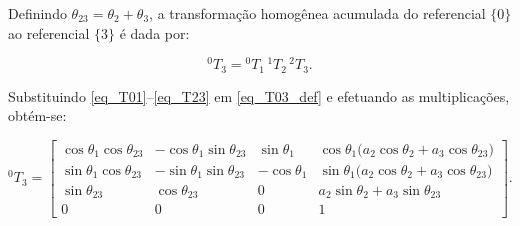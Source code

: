 


Definindo $\theta_{23}=\theta_2+\theta_3$, a transformação homogênea acumulada do referencial $\{0\}$ ao referencial $\{3\}$ é dada por:

\begin{equation}
{}^{0}T_{3} = {}^{0}T_{1}\,{}^{1}T_{2}\,{}^{2}T_{3}.
\label{eq_T03_def}
\end{equation}

Substituindo \eqref{eq_T01}--\eqref{eq_T23} em \eqref{eq_T03_def} e efetuando as multiplicações, obtém-se:

\begin{equation}
{}^{0}T_{3} =
\begin{bmatrix}
\cos\theta_{1}\cos\theta_{23} & -\cos\theta_{1}\sin\theta_{23} & \sin\theta_{1} & \cos\theta_{1}\bigl(a_2\cos\theta_{2}+a_3\cos\theta_{23}\bigr)\\
\sin\theta_{1}\cos\theta_{23} & -\sin\theta_{1}\sin\theta_{23} & -\cos\theta_{1} & \sin\theta_{1}\bigl(a_2\cos\theta_{2}+a_3\cos\theta_{23}\bigr)\\
\sin\theta_{23} & \cos\theta_{23} & 0 & a_2\sin\theta_{2}+a_3\sin\theta_{23}\\
0 & 0 & 0 & 1
\end{bmatrix}.
\label{eq_T03_final}
\end{equation}



